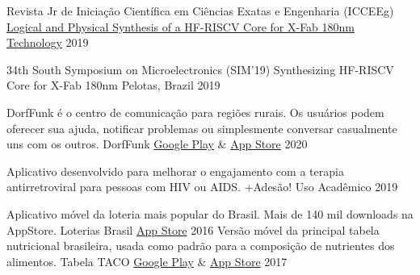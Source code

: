 
\begin{cventries}


    \cvcompactentry
    { Revista Jr de Iniciação Científica em Ciências Exatas e Engenharia (ICCEEg)}
    {\href{http://download.c3.furg.br/components/download_categoria/baixar.php?arquivo=e4873aa9a05cc5ed839561d121516766}{Logical and Physical Synthesis of a HF-RISCV Core for X-Fab 180nm Technology}}
    {}
    {2019}

  \cvcompactentry
    {34th South Symposium on Microelectronics (SIM'19)}
    {Synthesizing HF-RISCV Core for X-Fab 180nm}
    {Pelotas, Brazil}
    {2019}
\end{cventries}


\begin{cventries}

  \cvcompactentry
    {DorfFunk é o centro de comunicação para regiões rurais. Os usuários podem oferecer sua ajuda, notificar problemas ou simplesmente conversar casualmente uns com os outros.}
    {DorfFunk}
    {\href{https://play.google.com/store/apps/details?id=de.fhg.iese.dd.dorffunk.android&hl=pt_BR&gl=US}{Google Play} \& \href{https://apps.apple.com/app/id1348748008}{App Store} }
    {2020}

    \cvcompactentry
    {Aplicativo desenvolvido para melhorar o engajamento com a terapia antirretroviral para pessoas com HIV ou AIDS.}
    {+Adesão!}
    {Uso Acadêmico}
    {2019}

  \cvcompactentry
    {Aplicativo móvel da loteria mais popular do Brasil. Mais de 140 mil downloads na AppStore.}
    {Loterias Brasil}
    {\href{https://apps.apple.com/app/id992505562}{App Store}}
    {2016}
  \cvcompactentry
    {Versão móvel da principal tabela nutricional brasileira, usada como padrão para a composição de nutrientes dos alimentos.}
    {Tabela TACO}
    {\href{https://play.google.com/store/apps/details?id=rodrigo.TabelaTaco&hl=pt_BR&gl=US}{Google Play} \& \href{https://apps.apple.com/app/id1066079092}{App Store} }
    {2017}

\end{cventries}
